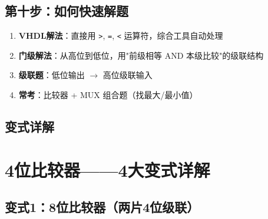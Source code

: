 \section{第十步：如何快速解题}

\begin{examtip}[比较器快速解题法]
\begin{enumerate}
  \item \textbf{VHDL解法}：直接用 \texttt{>}, \texttt{=}, \texttt{<} 运算符，综合工具自动处理
  \item \textbf{门级解法}：从高位到低位，用"前级相等 AND 本级比较"的级联结构
  \item \textbf{级联题}：低位输出 $\to$ 高位级联输入
  \item \textbf{常考}：比较器 + MUX 组合题（找最大/最小值）
\end{enumerate}
\end{examtip}

\section{变式详解}
\chapter{4位比较器——4大变式详解}

\section{变式1：8位比较器（两片4位级联）}

